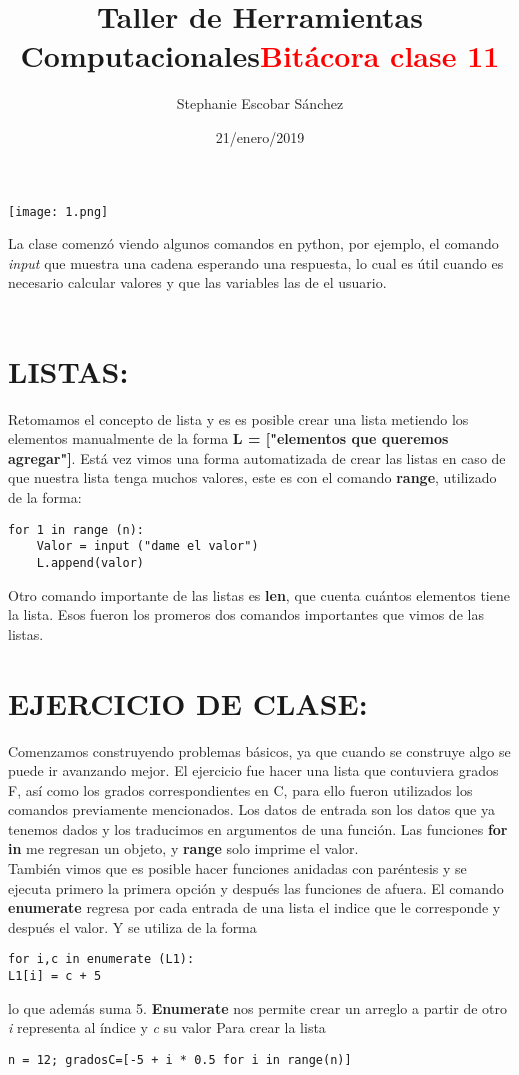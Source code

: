 \documentclass{article}
\title{\Huge Taller de Herramientas Computacionales}
\author{Stephanie Escobar Sánchez}
\date{21/enero/2019}
\begin{document}
	\maketitle
\begin{center}
	\texttt{[image: 1.png]}	
\end{center}
\newpage
\begin{center}
\title {\textcolor{red}{\Huge \textbf{Bitácora clase 11}} } 
\end{center}

La clase comenzó viendo algunos comandos en python, por ejemplo, el comando \textit{input}  que muestra una cadena esperando una respuesta, lo cual es útil cuando es necesario calcular valores y que las variables las de el usuario. \\
\\
\section{LISTAS:}
Retomamos el concepto de lista y es es posible crear una lista metiendo los elementos manualmente de la forma \textbf{L = ["elementos que queremos agregar"]}. Está vez vimos una forma automatizada de crear las listas en caso de que nuestra lista tenga muchos valores, este es con el comando \textbf{range}, utilizado de la forma: \\
\begin{verbatim}
for 1 in range (n):
	Valor = input ("dame el valor")
	L.append(valor)
\end{verbatim}
Otro comando importante de las listas es \textbf{len}, que cuenta cuántos elementos tiene la lista. Esos fueron los promeros dos comandos importantes que vimos de las listas.
\section{EJERCICIO DE CLASE:}

Comenzamos construyendo problemas básicos, ya que cuando se construye algo se puede ir avanzando mejor. El ejercicio fue hacer una lista que contuviera grados F, así como los grados correspondientes en C, para ello fueron utilizados los comandos previamente mencionados. Los datos de entrada son los datos que ya tenemos dados y los traducimos en argumentos de una función.
Las funciones \textbf{for in} me regresan un objeto, y \textbf{range} solo imprime el valor.\\
También vimos que es posible hacer funciones anidadas con paréntesis y se ejecuta primero la primera opción  y después las funciones de afuera.
El comando \textbf{enumerate} regresa por cada entrada de una lista el indice que le corresponde y después el valor. Y se utiliza de la forma 
\begin{verbatim}
for i,c in enumerate (L1):
L1[i] = c + 5
\end{verbatim}
lo que además suma 5. \textbf{Enumerate} nos permite crear un arreglo a partir de otro \textit{i} representa al índice y \textit{c} su valor
Para crear la lista 
\begin{verbatim}
n = 12; gradosC=[-5 + i * 0.5 for i in range(n)]
\end{verbatim}
 
\end{document}
